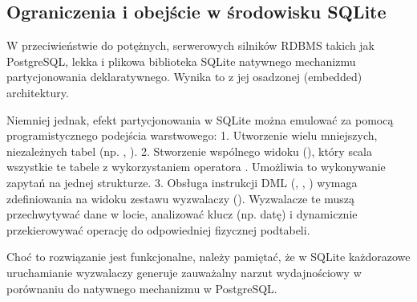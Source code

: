 \documentclass[letterpaper,10pt,polish]{sphinxmanual}
\begin{document}
\subsection{Ograniczenia i obejście w środowisku SQLite}
\label{\detokenize{rozdzia_u0142_2/rozdzia_u0142_26/index:ograniczenia-i-obejscie-w-srodowisku-sqlite}}
\sphinxAtStartPar
W przeciwieństwie do potężnych, serwerowych silników RDBMS takich jak PostgreSQL, lekka i plikowa biblioteka SQLite  natywnego mechanizmu partycjonowania deklaratywnego. Wynika to z jej osadzonej (embedded) architektury.

\sphinxAtStartPar
Niemniej jednak, efekt partycjonowania w SQLite można emulować za pomocą programistycznego podejścia warstwowego:
1.  Utworzenie wielu mniejszych, niezależnych tabel (np. , ).
2.  Stworzenie wspólnego widoku (), który scala wszystkie te tabele z wykorzystaniem operatora . Umożliwia to wykonywanie zapytań  na jednej strukturze.
3.  Obsługa instrukcji DML (, , ) wymaga zdefiniowania na widoku zestawu wyzwalaczy (). Wyzwalacze te muszą przechwytywać dane w locie, analizować klucz (np. datę) i dynamicznie przekierowywać operację do odpowiedniej fizycznej pod\sphinxhyphen{}tabeli.

\sphinxAtStartPar
Choć to rozwiązanie jest funkcjonalne, należy pamiętać, że w SQLite każdorazowe uruchamianie wyzwalaczy generuje zauważalny narzut wydajnościowy w porównaniu do natywnego mechanizmu w PostgreSQL.

\sphinxstepscope
\end{document}
